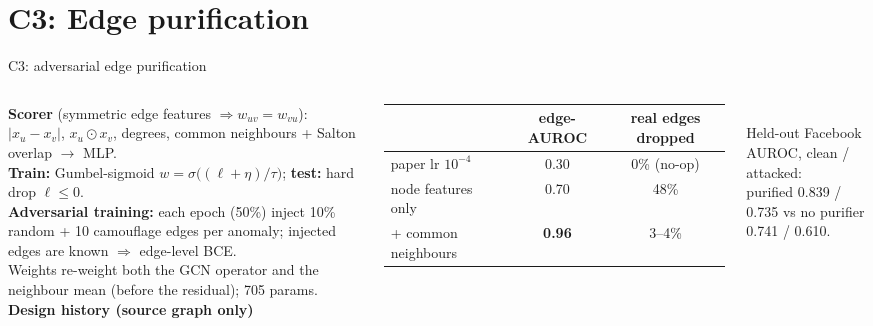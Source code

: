 \documentclass[aspectratio=169,11pt]{beamer}
\begin{document}
\section{C3: Edge purification}
\begin{frame}{C3: adversarial edge purification}
\begin{columns}[T]
\textbf{Scorer} (symmetric edge features $\Rightarrow w_{uv}=w_{vu}$): $|x_u-x_v|$, $x_u\!\odot\! x_v$, degrees, \alert{common neighbours + Salton overlap} $\to$ MLP.\\[3pt]
\textbf{Train:} Gumbel-sigmoid $w=\sigma\big((\ell+\eta)/\tau\big)$; \textbf{test:} hard drop $\ell\le0$.\\[3pt]
\textbf{Adversarial training:} each epoch (50\%) inject 10\% random + 10 camouflage edges per anomaly; injected edges are known $\Rightarrow$ edge-level BCE.\\[3pt]
\footnotesize Weights re-weight both the GCN operator and the neighbour mean (before the residual); 705 params.
\small\textbf{Design history (source graph only)}\\[2pt]
\footnotesize
\begin{tabular}{lcc}
\toprule
 & edge-AUROC & real edges dropped\\ \midrule
paper lr $10^{-4}$ & \textcolor{bad}{0.30} & 0\% (no-op)\\
node features only & 0.70 & \textcolor{bad}{48\%}\\
+ common neighbours & \textcolor{good}{\textbf{0.96}} & \textcolor{good}{3--4\%}\\ \bottomrule
\end{tabular}\\[5pt]
\scriptsize Held-out Facebook AUROC, clean / attacked:\\ purified 0.839 / 0.735 vs no purifier 0.741 / 0.610.
\end{columns}
\end{frame}
\end{document}
